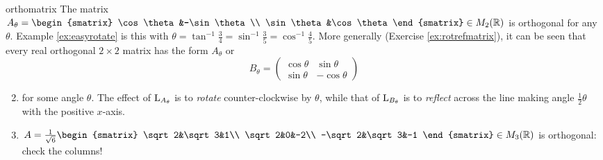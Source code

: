 \begin{examples}{}{orthomatrix}
	\exstart The matrix $A_\theta=
	\begin{smatrix}
		\cos\theta&-\sin\theta\\
		\sin\theta&\cos\theta
	\end{smatrix}
	\in M_2(\R)$ is orthogonal for any $\theta$. Example \ref{ex:easyrotate} is this with $\theta=\tan^{-1}\frac 34=\sin^{-1}\frac 35=\cos^{-1}\frac 45$. More generally (Exercise \ref{ex:rotrefmatrix}), it can be seen that every real orthogonal $2\times 2$ matrix has the form $A_\theta$ or
	\[
		B_\theta=
		\begin{pmatrix}
			\cos\theta&\sin\theta\\
			\sin\theta&-\cos\theta
		\end{pmatrix}
	\]
	\vspace{-12pt}
	\begin{enumerate}\setcounter{enumi}{1}
	  \item[]	for some angle $\theta$. The effect of $\mathrm{L}_{A_\theta}$ is to \emph{rotate} counter-clockwise by $\theta$, while that of $\mathrm{L}_{B_\theta}$ is to \emph{reflect} across the line making angle $\frac 12\theta$ with the positive $x$-axis.
	  
		\item $A=\frac 1{\sqrt 6}
		\begin{smatrix}
			\sqrt 2&\sqrt 3&1\\
			\sqrt 2&0&-2\\
			-\sqrt 2&\sqrt 3&-1
		\end{smatrix}
		\in M_3(\R)$ is orthogonal: check the columns!
		

\end{enumerate}
\end{examples}

